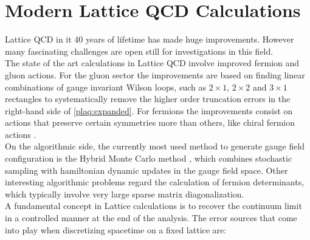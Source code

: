 \section{Modern Lattice QCD Calculations}
Lattice QCD in it 40 years of lifetime has made huge improvements. However many fascinating challenges are open still for investigations in this field. \\
The state of the art calculations in Lattice QCD involve improved fermion and gluon actions. For the gluon sector the improvements are based on finding linear combinations of gauge invariant Wilson loops, such as $2\times 1$, $2\times 2$ and $3\times 1$ rectangles to systematically remove the higher order truncation errors in the right-hand side of \cref{plaq:expanded}. For fermions the improvements consist on actions that preserve certain symmetries more than others, like chiral fermion actions \cite{degrand_chiral_2007}.\\
On the algorithmic side, the currently most used method to generate gauge field configuration is the Hybrid Monte Carlo method \cite{alles_hybrid_1996}, which combines stochastic sampling with hamiltonian dynamic updates in the  gauge field space. Other interesting algorithmic problems regard the calculation of fermion determinants, which typically involve very large sparse matrix diagonalization.\\
A fundamental concept in Lattice calculations is to recover the continuum limit in a controlled manner at the end of the analysis. The error sources that come into play when discretizing spacetime on a fixed lattice are:
